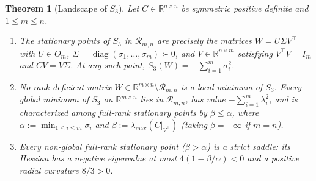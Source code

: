 \documentclass[11pt]{article}
\theoremstyle{plain}
\newtheorem{theorem}{Theorem}
\theoremstyle{definition}
\theoremstyle{remark}
\DeclareMathOperator{\diag}{diag}
\begin{document}
\begin{theorem}[Landscape of $S_3$]\label{thm:c2}
Let $C \in \mathbb{R}^{n \times n}$ be symmetric positive definite and $1 \le m \le n$.
\begin{enumerate}[label=\textup{(\arabic*)}]
\item The stationary points of $S_3$ in $\mathcal{R}_{m,n}$ are precisely the matrices $W = U \Sigma V^\top$ with $U \in O_m$, $\Sigma = \diag(\sigma_1, \dots, \sigma_m) \succ 0$, and $V \in \mathbb{R}^{n \times m}$ satisfying $V^\top V = I_m$ and $CV = V\Sigma$. At any such point, $S_3(W) = -\sum_{i=1}^m \sigma_i^2$.
\item No rank-deficient matrix $W \in \mathbb{R}^{m \times n} \setminus \mathcal{R}_{m,n}$ is a local minimum of $S_3$. Every global minimum of $S_3$ on $\mathbb{R}^{m \times n}$ lies in $\mathcal{R}_{m,n}$, has value $-\sum_{i=1}^m \lambda_i^2$, and is characterized among full-rank stationary points by $\beta \le \alpha$, where $\alpha := \min_{1 \le i \le m} \sigma_i$ and $\beta := \lambda_{\max}(C|_{V^\perp})$ (taking $\beta = -\infty$ if $m = n$).
\item Every non-global full-rank stationary point ($\beta > \alpha$) is a strict saddle: its Hessian has a negative eigenvalue at most $4(1 - \beta/\alpha) < 0$ and a positive radial curvature $8/3 > 0$.
\end{enumerate}
\end{theorem}
\end{document}
